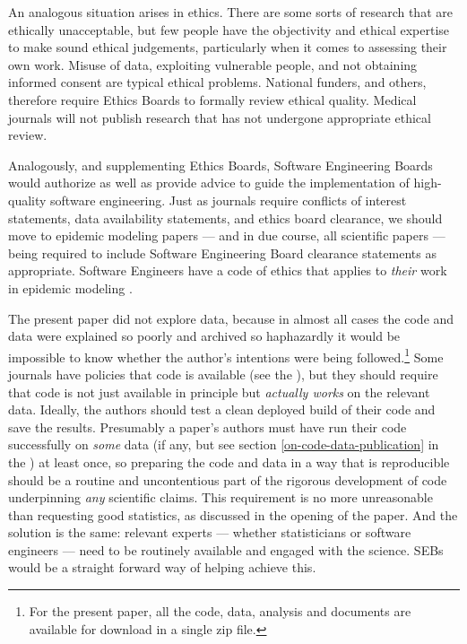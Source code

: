 An analogous situation arises in ethics. There are some sorts of research that are ethically unacceptable, but few people have the objectivity and ethical expertise to make sound ethical judgements, particularly when it comes to assessing their own work. Misuse of data, exploiting vulnerable people, and not obtaining informed consent are typical ethical problems. National funders, and others, therefore require Ethics Boards to formally review ethical quality. Medical journals will not publish research that has not undergone appropriate ethical review. 

Analogously, and supplementing Ethics Boards, Software Engineering Boards would authorize as well as provide advice to guide the implementation of high-quality software engineering. Just as journals require conflicts of interest statements, data availability statements, and ethics board clearance, we should move to epidemic modeling papers --- and in due course, all scientific papers --- being required to include Software Engineering Board clearance statements as appropriate. {Software Engineers have a code of ethics that applies to \emph{their\/} work in epidemic modeling \cite{ethics-code}.}

{The present paper did not explore data, because in almost all cases the code and data were explained so poorly and archived so haphazardly it would be impossible to know whether the author's intentions were being followed.\footnote{{For the present paper, all the code, data, analysis and documents are available for download in a single zip file.}} Some journals have policies that code is available (see the \supplement), but they should require that code is not just available in principle but \emph{actually works\/} on the relevant data. Ideally, the authors should test a clean deployed build of their code and save the results. Presumably a paper's authors must have run their code successfully on \emph{some\/} data (if any, but see section \ref{on-code-data-publication} in the \supplement) at least once, so preparing the code and data in a way that is reproducible should be a routine and uncontentious part of the rigorous development of  code underpinning \emph{any\/} scientific claims. This requirement is no more unreasonable than requesting good statistics, as discussed in the opening of the paper. And the solution is the same: relevant experts --- whether statisticians or software engineers --- need to be routinely available and engaged with the science. SEBs would be a straight forward way of helping achieve this.}


